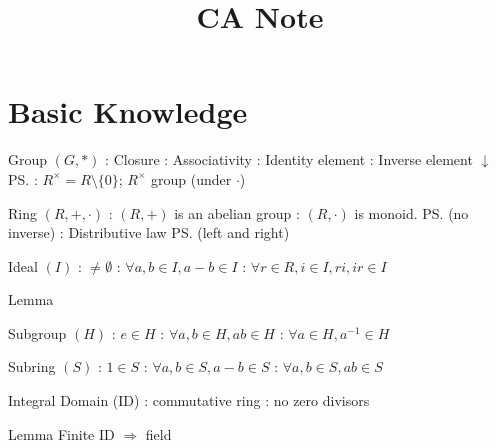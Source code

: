 \documentclass{note}
\title{CA Note}
\author{}
\begin{document}
\maketitle
\thispagestyle{fancy}

\section{Basic Knowledge}

\begin{MyTh}{Group $(G,*)$}
    : Closure \quad {}: Associativity \quad {}: Identity element \quad {}: Inverse element \quad\quad $\downarrow$ \ps{\tiny {}: $R^{\times}=R\setminus\{0\}$; $R^\times$ group (under $\cdot$)}
\end{MyTh}

\begin{MyTh}{Ring $(R,+,\cdot)$}
    : $(R,+)$ is an abelian group \quad {}: $(R,\cdot)$ is monoid. \ps{(no inverse)} \quad {}: Distributive law \ps{(left and right)}
\end{MyTh}

\begin{MyTh}{Ideal $(I)$}
    : $\ne\emptyset$ \quad {}: $\forall a,b\in I, a-b\in I$ \quad {}: $\forall r\in R,i\in I, ri,ir\in I$ \qquad
\end{MyTh}
\begin{MyTh}{Lemma}
\end{MyTh}

{\footnotesize\vspace{-3pt}
\begin{MyTh}{Subgroup $(H)$}
    : $e\in H$ \quad {}: $\forall a,b\in H, ab\in H$ \quad {}: $\forall a\in H, a^{-1}\in H$ \qquad
\end{MyTh}
\begin{MyTh}{Subring $(S)$}
    : $1\in S$ \quad {}: $\forall a,b\in S, a-b\in S$ \quad {}: $\forall a,b\in S, ab\in S$
\end{MyTh}
}

\begin{MyTh}{Integral Domain (ID)}
    : commutative ring \quad {}: no zero divisors \qquad
\end{MyTh}
\begin{MyTh}{Lemma}
    Finite ID $\Rightarrow$ field \quad {}
\end{MyTh}
\end{document}
